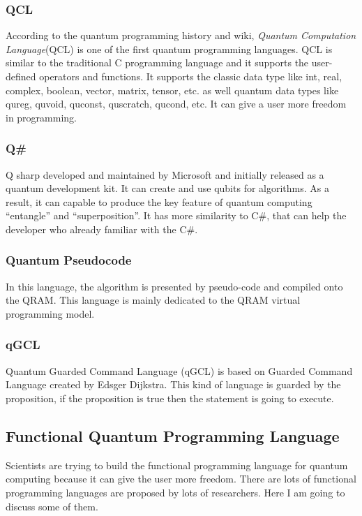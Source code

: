 \documentclass[11pt, conference, onecolumn]{IEEEtran}
\begin{document}
\subsubsection{QCL}
According to the quantum programming history and wiki, \textit{Quantum Computation Language}(QCL) is one of the first quantum programming languages. QCL is similar to the 
traditional C programming language and it supports the user-defined operators and functions. It supports the classic data type like int, real, complex, boolean, vector, 
matrix, tensor, etc. as well quantum data types like qureg, quvoid, quconst, quscratch, qucond, etc. It can give a user more freedom in programming.

\subsubsection{Q\#}
Q sharp developed and maintained by Microsoft and initially released as a quantum development kit. It can create and use qubits for algorithms. As a result, it can capable to produce the 
key feature of quantum computing ``entangle'' and ``superposition''. It has more similarity to C\#, that can help the developer who already familiar with the C\#.

\subsubsection{Quantum Pseudocode}
In this language, the algorithm is presented by pseudo-code and compiled onto the QRAM. This language is mainly dedicated to the QRAM virtual programming model.

\subsubsection{qGCL}
Quantum Guarded Command Language (qGCL) is based on Guarded Command Language created by Edsger Dijkstra. This kind of language is guarded by the proposition, if the proposition is 
true then the statement is going to execute.
 
\subsection{Functional Quantum Programming Language}
Scientists are trying to build the functional programming language for quantum computing because it can give the user more freedom. There are lots of functional programming languages 
are proposed by lots of researchers. Here I am going to discuss some of them. 
\end{document}
